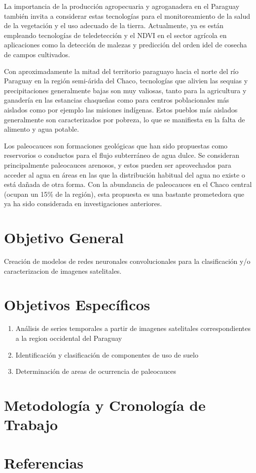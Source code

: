 \documentclass[a4paper, 11pt]{article}
\begin{document}
La importancia de la producción agropecuaria y agroganadera en el Paraguay también invita a considerar estas tecnologías para el monitoreamiento de la salud de la vegetación y el uso adecuado de la tierra. Actualmente, ya es están empleando tecnologías de teledetección y el NDVI en el sector agrícola en aplicaciones como la detección de malezas y predicción del orden idel de cosecha de campos cultivados. \autocite{onesoil-agricultura-paraguay}

Con aproximadamente la mitad del territorio paraguayo hacia el norte del río Paraguay en la región semi-árida del Chaco, tecnologías que alivien las sequias y precipitaciones generalmente bajas son muy valiosas, tanto para la agricultura y ganadería en las estancias chaqueñas como para centros poblacionales más aislados como por ejemplo las misiones indígenas. Estos pueblos más aislados generalmente son caracterizados por pobreza, lo que se manifiesta en la falta de alimento y agua potable.

Los paleocauces son formaciones geológicas que han sido propuestas como reservorios o conductos para el flujo subterráneo de agua dulce. Se consideran principalmente paleocauces arenosos, y estos pueden ser aprovechados para acceder al agua en áreas en las que la distribución habitual del agua no existe o está dañada de otra forma. \autocite{wikipedia-paleochannel} Con la abundancia de paleocauces en el Chaco central (ocupan un 15\% de la región), esta propuesta es una bastante prometedora que ya ha sido considerada en investigaciones anteriores. \autocite{conacyt-sistemas-captacion-agua}

\section*{Objetivo General}
Creación de modelos de redes neuronales convolucionales para la clasificación y/o caracterizacion de imagenes satelitales.

\section*{Objetivos Específicos}
\begin{enumerate}
    \item Análisis de series temporales a partir de imagenes satelitales correspondientes a la region occidental del Paraguay
    \item Identificación y clasificación de componentes de uso de suelo
    \item Determinación de areas de ocurrencia de paleocauces
\end{enumerate}

\section*{Metodología y Cronología de Trabajo}

\section*{Referencias}
\printbibliography
\end{document}
